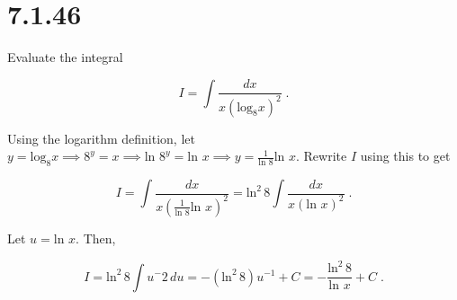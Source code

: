 \documentclass[11pt]{article}
\begin{document}
\section*{7.1.46}

Evaluate the integral

$$I = \int \frac{dx}{x(\text{log}_8x)^2} \;.$$

Using the logarithm definition, let $y = \text{log}_8x \implies 8^y = x \implies \text{ln }8^y = \text{ln } x \implies  y = \frac{1}{\text{ln }8} \text{ln } x$. Rewrite $I$ using this to get

$$I = \int \frac{dx}{x(\frac{1}{\text{ln }8} \text{ln } x)^2} =\text{ln}^2 \,8 \int \frac{dx}{x (\text{ln } x)^2} \;.$$

Let $u = \text{ln } x$. Then,

$$I = \text{ln}^2 \,8 \int u^-2 \, du = -(\text{ln}^2 \,8)u^{-1} + C = -\frac{\text{ln}^2 \,8}{\text{ln }x} + C \;.$$
\end{document}
